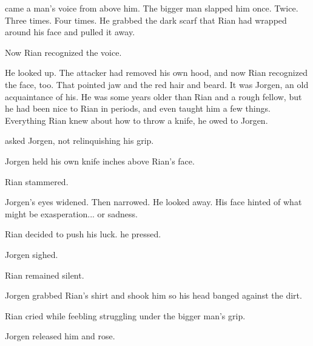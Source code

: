  came a man's voice from above him. 
The bigger man slapped him once. 
Twice. 
Three times. 
Four times. 
He grabbed the dark scarf that Rian had wrapped around his face and pulled it away. 


Now Rian recognized the voice. 


He looked up. 
The attacker had removed his own hood, and now Rian recognized the face, too. 
That pointed jaw and the red hair and beard. 
It was Jorgen, an old acquaintance of his. 
He was some years older than Rian and a rough fellow, but he had been nice to Rian in periods, and even taught him a few things. 
Everything Rian knew about how to throw a knife, he owed to Jorgen. 

asked Jorgen, not relinquishing his grip. 


Jorgen held his own knife inches above Rian's face.

 Rian stammered. 

Jorgen's eyes widened. 
Then narrowed. 
He looked away. 
His face hinted of what might be exasperation... or sadness. 

Rian decided to push his luck. 
he pressed. 

Jorgen sighed. 

Rian remained silent. 

Jorgen grabbed Rian's shirt and shook him so his head banged against the dirt. 

 Rian cried while feebling struggling under the bigger man's grip. 

Jorgen released him and rose. 

